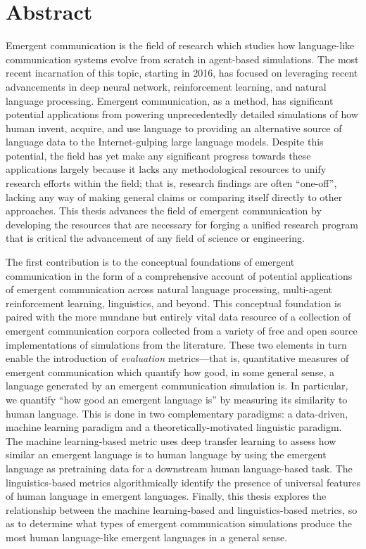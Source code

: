 






\newpage
\thispagestyle{plain}
\section*{Abstract}
Emergent communication is the field of research which studies how language-like communication systems evolve from scratch in agent-based simulations.
The most recent incarnation of this topic, starting in 2016, has focused on leveraging recent advancements in deep neural network, reinforcement learning, and natural language processing.
Emergent communication, as a method, has significant potential applications from powering unprecedentedly detailed simulations of how human invent, acquire, and use language to providing an alternative source of language data to the Internet-gulping large language models.
Despite this potential, the field has yet make any significant progress towards these applications largely because it lacks any methodological resources to unify research efforts within the field;
  that is, research findings are often ``one-off'', lacking any way of making general claims or comparing itself directly to other approaches.
This thesis advances the field of emergent communication by developing the resources that are necessary for forging a unified research program that is critical the advancement of any field of science or engineering.

The first contribution is to the conceptual foundations of emergent communication in the form of a comprehensive account of potential applications of emergent communication across natural language processing, multi-agent reinforcement learning, linguistics, and beyond.
This conceptual foundation is paired with the more mundane but entirely vital data resource of a collection of emergent communication corpora collected from a variety of free and open source implementations of simulations from the literature.
These two elements in turn enable the introduction of \emph{evaluation} metrics---that is, quantitative measures of emergent communication which quantify how good, in some general sense, a language generated by an emergent communication simulation is.
In particular, we quantify ``how good an emergent language is'' by measuring its similarity to human language.
This is done in two complementary paradigms: a data-driven, machine learning paradigm and a theoretically-motivated linguistic paradigm.
The machine learning-based metric uses deep transfer learning to assess how similar an emergent language is to human language by using the emergent language as pretraining data for a downstream human language-based task.
The linguistics-based metrics algorithmically identify the presence of universal features of human language in emergent languages.
Finally, this thesis explores the relationship between the machine learning-based and linguistics-based metrics, so as to determine what types of emergent communication simulations produce the most human language-like emergent languages in a general sense.


